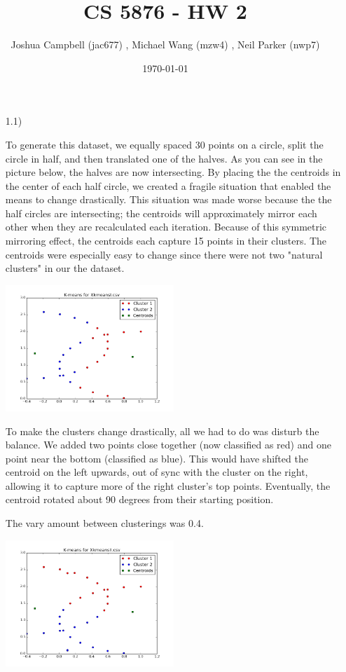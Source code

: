 \documentclass[12pt]{article}
\title{CS 5876 - HW 2}
\author{Joshua Campbell (jac677) , Michael Wang (mzw4) , Neil Parker (nwp7) }
\date{\today}
\begin{document}
\maketitle

\begin{enumerate}

\item[1.1)]

To generate this dataset, we equally spaced 30 points on a circle, split the circle in half, and then translated one of the halves. As you can see in the picture below, the halves are now intersecting. By placing the the centroids in the center of each half circle, we created a fragile situation that enabled the means to change drastically. This situation was made worse because the the half circles are intersecting; the centroids will approximately mirror each other when they are recalculated each iteration. Because of this symmetric mirroring effect, the centroids each capture 15 points in their clusters. The centroids were especially easy to change since there were not two "natural clusters" in our the dataset.

\includegraphics[width=0.5\textwidth]{K-means_for_XkmeansI.png}

To make the clusters change drastically, all we had to do was disturb the balance. We added two points close together (now classified as red) and one point near the bottom (classified as blue). This would have shifted the centroid on the left upwards, out of sync with the cluster on the right, allowing it to capture more of the right cluster's top points. Eventually, the centroid rotated about 90 degrees from their starting position.

The vary amount between clusterings was 0.4.

\includegraphics[width=0.5\textwidth]{K-means_for_XkmeansII.png}


\end{enumerate}
\end{document}
